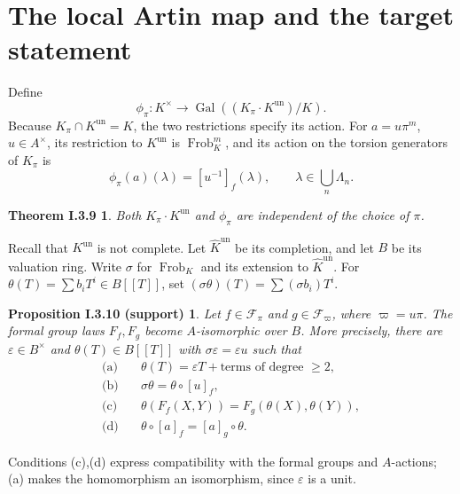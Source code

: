 \documentclass[11pt]{article}
\newcommand{\un}{\mathrm{un}}
\newcommand{\Gal}{\operatorname{Gal}}
\newcommand{\Frob}{\operatorname{Frob}}
\newcommand{\terms}[1]{\text{terms of degree }\geq #1}
\newcommand{\Khat}{\widehat K^{\un}}
\newtheorem*{target}{Theorem I.3.9}
\newtheorem*{comparison}{Proposition I.3.10 (support)}
\begin{document}

\section*{The local Artin map and the target statement}
Define
\[
 \phi_\pi:K^\times\longrightarrow\Gal((K_\pi\cdot K^{\un})/K).
\]
Because $K_\pi\cap K^{\un}=K$, the two restrictions specify its action.
For $a=u\pi^m$, $u\in A^\times$, its restriction to $K^{\un}$ is $\Frob_K^m$,
and its action on the torsion generators of $K_\pi$ is
\[
 \phi_\pi(a)(\lambda)=[u^{-1}]_f(\lambda),\qquad
 \lambda\in\bigcup_n\Lambda_n.
\]
\begin{target}
Both $K_\pi\cdot K^{\un}$ and $\phi_\pi$ are independent of the choice of $\pi$.
\end{target}

Recall that $K^{\un}$ is not complete. Let $\Khat$ be its completion, and let
$B$ be its valuation ring. Write $\sigma$ for $\Frob_K$ and its extension to
$\Khat$. For $\theta(T)=\sum b_iT^i\in B[[T]]$, set
$(\sigma\theta)(T)=\sum(\sigma b_i)T^i$.

\begin{comparison}
Let $f\in\mathcal F_\pi$ and $g\in\mathcal F_\varpi$, where $\varpi=u\pi$.
The formal group laws $F_f,F_g$ become $A$-isomorphic over $B$.
More precisely, there are $\varepsilon\in B^\times$ and $\theta(T)\in B[[T]]$
with $\sigma\varepsilon=\varepsilon u$ such that
\begin{align*}
 \text{(a)}\quad&\theta(T)=\varepsilon T+\terms{2},\\
 \text{(b)}\quad&\sigma\theta=\theta\circ[u]_f,\\
 \text{(c)}\quad&\theta(F_f(X,Y))=F_g(\theta(X),\theta(Y)),\\
 \text{(d)}\quad&\theta\circ[a]_f=[a]_g\circ\theta.
\end{align*}
\end{comparison}
Conditions (c),(d) express compatibility with the formal groups and $A$-actions;
(a) makes the homomorphism an isomorphism, since $\varepsilon$ is a unit.
\end{document}
